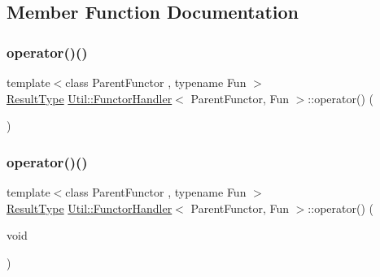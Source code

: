 \subsection{Member Function Documentation}
\mbox{\label{classUtil_1_1FunctorHandler_a568e55043d17f0034572b4ad2772391e}} 
\subsubsection{\texorpdfstring{operator()()}{operator()()}\hspace{0.1cm}{\footnotesize\ttfamily [1/18]}}
{\footnotesize\ttfamily template$<$class Parent\+Functor , typename Fun $>$ \\
\mbox{\hyperlink{classUtil_1_1FunctorHandler_a036da44b8cc2567704cebd2a20d16c80}{Result\+Type}} \mbox{\hyperlink{classUtil_1_1FunctorHandler}{Util\+::\+Functor\+Handler}}$<$ Parent\+Functor, Fun $>$\+::operator() (\begin{DoxyParamCaption}{ }\end{DoxyParamCaption})\hspace{0.3cm}{\ttfamily [inline]}}

\mbox{\label{classUtil_1_1FunctorHandler_a568e55043d17f0034572b4ad2772391e}} 
\subsubsection{\texorpdfstring{operator()()}{operator()()}\hspace{0.1cm}{\footnotesize\ttfamily [2/18]}}
{\footnotesize\ttfamily template$<$class Parent\+Functor , typename Fun $>$ \\
\mbox{\hyperlink{classUtil_1_1FunctorHandler_a036da44b8cc2567704cebd2a20d16c80}{Result\+Type}} \mbox{\hyperlink{classUtil_1_1FunctorHandler}{Util\+::\+Functor\+Handler}}$<$ Parent\+Functor, Fun $>$\+::operator() (\begin{DoxyParamCaption}\item[{void}]{ }\end{DoxyParamCaption})\hspace{0.3cm}{\ttfamily [inline]}}

